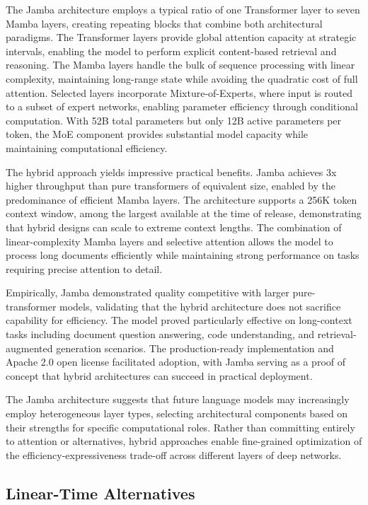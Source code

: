 The Jamba architecture employs a typical ratio of one Transformer layer to seven Mamba layers, creating repeating blocks that combine both architectural paradigms. The Transformer layers provide global attention capacity at strategic intervals, enabling the model to perform explicit content-based retrieval and reasoning. The Mamba layers handle the bulk of sequence processing with linear complexity, maintaining long-range state while avoiding the quadratic cost of full attention. Selected layers incorporate Mixture-of-Experts, where input is routed to a subset of expert networks, enabling parameter efficiency through conditional computation. With 52B total parameters but only 12B active parameters per token, the MoE component provides substantial model capacity while maintaining computational efficiency.

The hybrid approach yields impressive practical benefits. Jamba achieves 3x higher throughput than pure transformers of equivalent size, enabled by the predominance of efficient Mamba layers. The architecture supports a 256K token context window, among the largest available at the time of release, demonstrating that hybrid designs can scale to extreme context lengths. The combination of linear-complexity Mamba layers and selective attention allows the model to process long documents efficiently while maintaining strong performance on tasks requiring precise attention to detail.

Empirically, Jamba demonstrated quality competitive with larger pure-transformer models, validating that the hybrid architecture does not sacrifice capability for efficiency. The model proved particularly effective on long-context tasks including document question answering, code understanding, and retrieval-augmented generation scenarios. The production-ready implementation and Apache 2.0 open license facilitated adoption, with Jamba serving as a proof of concept that hybrid architectures can succeed in practical deployment.

The Jamba architecture suggests that future language models may increasingly employ heterogeneous layer types, selecting architectural components based on their strengths for specific computational roles. Rather than committing entirely to attention or alternatives, hybrid approaches enable fine-grained optimization of the efficiency-expressiveness trade-off across different layers of deep networks.

\subsection{Linear-Time Alternatives}

